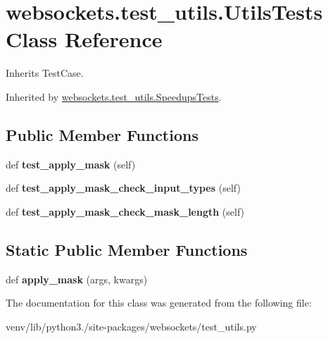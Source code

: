 \hypertarget{classwebsockets_1_1test__utils_1_1_utils_tests}{}\section{websockets.\+test\+\_\+utils.\+Utils\+Tests Class Reference}
\label{classwebsockets_1_1test__utils_1_1_utils_tests}


Inherits Test\+Case.



Inherited by \hyperlink{classwebsockets_1_1test__utils_1_1_speedups_tests}{websockets.\+test\+\_\+utils.\+Speedups\+Tests}.

\subsection*{Public Member Functions}
\begin{DoxyCompactItemize}
\item 
\mbox{\label{classwebsockets_1_1test__utils_1_1_utils_tests_a8a3f2da24a480ce6cdf5f37a13a9ca5d}} 
def {\bfseries test\+\_\+apply\+\_\+mask} (self)
\item 
\mbox{\label{classwebsockets_1_1test__utils_1_1_utils_tests_a5505eaf7826f8a8b17eb4e6cf940a517}} 
def {\bfseries test\+\_\+apply\+\_\+mask\+\_\+check\+\_\+input\+\_\+types} (self)
\item 
\mbox{\label{classwebsockets_1_1test__utils_1_1_utils_tests_a28cec249c92bf57a177b81b793453d79}} 
def {\bfseries test\+\_\+apply\+\_\+mask\+\_\+check\+\_\+mask\+\_\+length} (self)
\end{DoxyCompactItemize}
\subsection*{Static Public Member Functions}
\begin{DoxyCompactItemize}
\item 
\mbox{\label{classwebsockets_1_1test__utils_1_1_utils_tests_aa7c54e46362d6d3c1ba12103875e65d6}} 
def {\bfseries apply\+\_\+mask} (args, kwargs)
\end{DoxyCompactItemize}


The documentation for this class was generated from the following file\+:\begin{DoxyCompactItemize}
\item 
venv/lib/python3./site-\/packages/websockets/test\+\_\+utils.\+py\end{DoxyCompactItemize}
